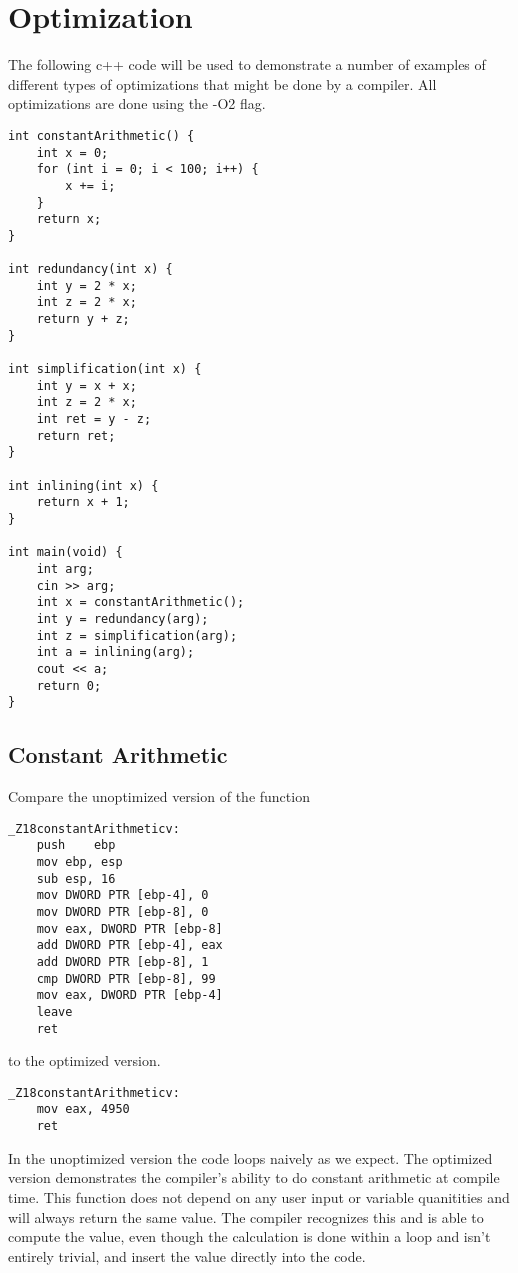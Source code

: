 \documentclass{article}
\begin{document}
\section{Optimization}
The following c++ code will be used to demonstrate a number of examples of different types of optimizations that might be done by a compiler. All optimizations are done using the -O2 flag.
\begin{lstlisting}
int constantArithmetic() {
    int x = 0;
    for (int i = 0; i < 100; i++) {
        x += i;
    }
    return x;
}

int redundancy(int x) {
    int y = 2 * x;
    int z = 2 * x;
    return y + z;
}

int simplification(int x) {
    int y = x + x;
    int z = 2 * x;
    int ret = y - z;
    return ret;
}

int inlining(int x) {
    return x + 1;
}

int main(void) {
    int arg;
    cin >> arg;
    int x = constantArithmetic();
    int y = redundancy(arg);
    int z = simplification(arg);
    int a = inlining(arg);
    cout << a;
    return 0;
}
\end{lstlisting}

\subsection{Constant Arithmetic}
Compare the unoptimized version of the function
\begin{lstlisting}
_Z18constantArithmeticv:
	push	ebp
	mov	ebp, esp
	sub	esp, 16
	mov	DWORD PTR [ebp-4], 0
	mov	DWORD PTR [ebp-8], 0
	mov	eax, DWORD PTR [ebp-8]
	add	DWORD PTR [ebp-4], eax
	add	DWORD PTR [ebp-8], 1
	cmp	DWORD PTR [ebp-8], 99
	mov	eax, DWORD PTR [ebp-4]
	leave
	ret
\end{lstlisting}
to the optimized version.
\begin{lstlisting}
_Z18constantArithmeticv:
	mov	eax, 4950
	ret
\end{lstlisting}
In the unoptimized version the code loops naively as we expect. The optimized version demonstrates the compiler's ability to do constant arithmetic at compile time. This function does not depend on any user input or variable quanitities and will always return the same value. The compiler recognizes this and is able to compute the value, even though the calculation is done within a loop and isn't entirely trivial, and insert the value directly into the code.
\end{document}
